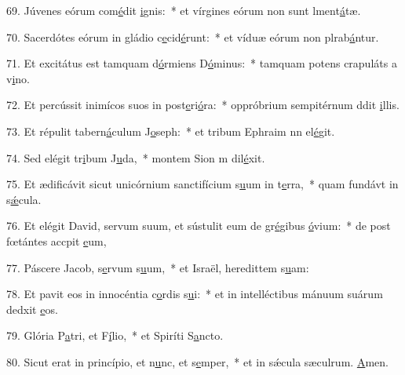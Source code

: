 69. Júvenes eórum com\uline{é}dit \uline{i}gnis:~* et vírgines eórum non sunt lment\uline{á}tæ.\par 
70. Sacerdótes eórum in gládio c\uline{e}cid\uline{é}runt:~* et víduæ eórum non plrab\uline{á}ntur.\par 
71. Et excitátus est tamquam d\uline{ó}rmiens D\uline{ó}minus:~* tamquam potens crapuláts a v\uline{i}no.\par 
72. Et percússit inimícos suos in post\uline{e}ri\uline{ó}ra:~* oppróbrium sempitérnum ddit \uline{i}llis.\par 
73. Et répulit tabern\uline{á}culum J\uline{o}seph:~* et tribum Ephraim nn el\uline{é}git.\par 
74. Sed elégit tr\uline{i}bum J\uline{u}da,~* montem Sion m dil\uline{é}xit.\par 
75. Et ædificávit sicut unicórnium sanctifícium s\uline{u}um in t\uline{e}rra,~* quam fundávt in s\uline{ǽ}cula.\par 
76. Et elégit David, servum suum, et sústulit eum de gr\uline{é}gibus \uline{ó}vium:~* de post fœtántes accpit \uline{e}um,\par 
77. Páscere Jacob, s\uline{e}rvum s\uline{u}um,~* et Israël, heredittem s\uline{u}am:\par 
78. Et pavit eos in innocéntia c\uline{o}rdis s\uline{u}i:~* et in intelléctibus mánuum suárum dedxit \uline{e}os.\par 
79. Glória P\uline{a}tri, et F\uline{í}lio,~* et Spiríti S\uline{a}ncto.\par 
80. Sicut erat in princípio, et n\uline{u}nc, et s\uline{e}mper,~* et in sǽcula sæculrum. \uline{A}men.\par 
